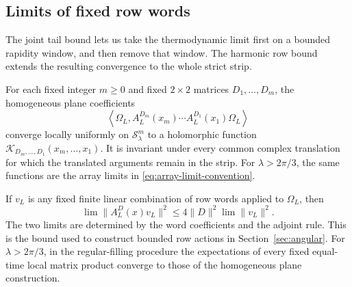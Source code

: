 \subsection{Limits of fixed row words}

The joint tail bound lets us take the thermodynamic limit first on a
bounded rapidity window, and then remove that window.  The harmonic
row bound extends the resulting convergence to the whole strict strip.

\begin{proposition}\label{prop:word-kernel}
For each fixed integer $m\ge0$ and fixed $2\times2$ matrices
$D_1,\ldots,D_m$, the homogeneous plane coefficients
\begin{equation}\label{eq:word-kernel-definition}
 \left\langle\Omega_L,
     A_L^{D_m}(x_m)\cdots A_L^{D_1}(x_1)\Omega_L\right\rangle
\end{equation}
converge locally uniformly on $\mathcal S_\lambda^m$ to a
holomorphic function
$\mathcal K_{D_m,\ldots,D_1}(x_m,\ldots,x_1)$.
It is invariant under every common complex translation for which
the translated arguments remain in the strip.
For $\lambda>2\pi/3$, the same functions are the array limits in
\eqref{eq:array-limit-convention}.

If $v_L$ is any fixed finite linear combination of row words applied to
$\Omega_L$, then
\[
 \lim\|A_L^D(x)v_L\|^2
       \le4\|D\|^2\lim\|v_L\|^2.
\]
The two limits are determined by the word coefficients and the adjoint
rule. This is the bound used to construct bounded row actions in
Section~\ref{sec:angular}.
For $\lambda>2\pi/3$, in the regular-filling procedure the expectations of every fixed
equal-time local matrix product converge to those of the
homogeneous plane construction.
\end{proposition}

